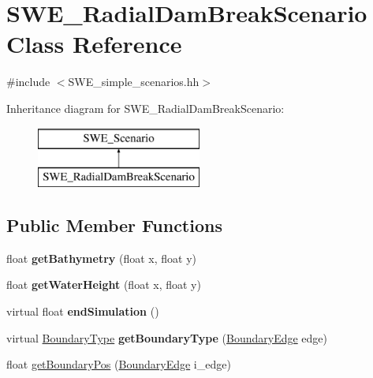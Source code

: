 \hypertarget{classSWE__RadialDamBreakScenario}{\section{S\-W\-E\-\_\-\-Radial\-Dam\-Break\-Scenario Class Reference}
\label{classSWE__RadialDamBreakScenario}
}


{\ttfamily \#include $<$S\-W\-E\-\_\-simple\-\_\-scenarios.\-hh$>$}

Inheritance diagram for S\-W\-E\-\_\-\-Radial\-Dam\-Break\-Scenario\-:\begin{figure}[H]
\begin{center}
\leavevmode
\includegraphics[height=2.000000cm]{classSWE__RadialDamBreakScenario}
\end{center}
\end{figure}
\subsection*{Public Member Functions}
\begin{DoxyCompactItemize}
\item 
\hypertarget{classSWE__RadialDamBreakScenario_ab54c88d18ff3a577a3e33f1659d97b50}{float {\bfseries get\-Bathymetry} (float x, float y)}\label{classSWE__RadialDamBreakScenario_ab54c88d18ff3a577a3e33f1659d97b50}

\item 
\hypertarget{classSWE__RadialDamBreakScenario_a0fb0917dd1e47f9580bd94ba5816795c}{float {\bfseries get\-Water\-Height} (float x, float y)}\label{classSWE__RadialDamBreakScenario_a0fb0917dd1e47f9580bd94ba5816795c}

\item 
\hypertarget{classSWE__RadialDamBreakScenario_a5e118a3d34aace3175745965d5d9c567}{virtual float {\bfseries end\-Simulation} ()}\label{classSWE__RadialDamBreakScenario_a5e118a3d34aace3175745965d5d9c567}

\item 
\hypertarget{classSWE__RadialDamBreakScenario_a40a7ddfd7d85631eeb708232c9f7f20d}{virtual \hyperlink{SWE__Scenario_8hh_af75d5dd7322fa39ed0af4e7839e600f8}{Boundary\-Type} {\bfseries get\-Boundary\-Type} (\hyperlink{SWE__Scenario_8hh_aa5e01e3f7df312f7b9b0d02521141fcc}{Boundary\-Edge} edge)}\label{classSWE__RadialDamBreakScenario_a40a7ddfd7d85631eeb708232c9f7f20d}

\item 
float \hyperlink{classSWE__RadialDamBreakScenario_ac5392df630c8164560df5cb902df385a}{get\-Boundary\-Pos} (\hyperlink{SWE__Scenario_8hh_aa5e01e3f7df312f7b9b0d02521141fcc}{Boundary\-Edge} i\-\_\-edge)
\end{DoxyCompactItemize}


